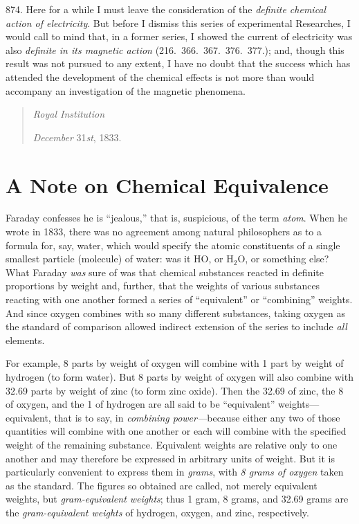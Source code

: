 874. Here for a while I must leave the consideration of the
\emph{definite chemical action of electricity}. But before I dismiss
this series of experimental Researches, I would call to mind that, in a
former series, I showed the current of electricity was also
\emph{definite in its magnetic action} (216.\ 366.\ 367.\ 376.\ 377.); and,
though this result was not pursued to any extent, I have no doubt that
the success which has attended the development of the chemical effects
is not more than would accompany an investigation of the magnetic
phenomena.

\begin{quotation}
\emph{Royal Institution}

\emph{December} 31\emph{st}, 1833.
\end{quotation}

\section*{A Note on Chemical Equivalence}

Faraday confesses he is ``jealous,'' that is, suspicious, of the term
\emph{atom}. When he wrote in 1833, there was no agreement among natural
philosophers as to a formula for, say, water, which would specify the
atomic constituents of a single smallest particle (mol\-e\-cule) of water:
was it HO, or H$_2$O, or something else? What Faraday \emph{was} sure of
was that chemical substances reacted in definite pro\-por\-tions by weight
and, further, that the weights of various substances reacting with one
another formed a series of ``equivalent'' or ``combining'' weights. And
since oxygen combines with so many different substances, taking oxygen
as the standard of comparison allowed indirect extension of the series
to include \emph{all} elements.

For example, 8 parts by weight of oxygen will combine with 1 part by
weight of hydrogen (to form water). But 8 parts by weight of oxygen will
also combine with 32.69 parts by weight of zinc (to form zinc oxide).
Then the 32.69 of zinc, the 8 of oxygen, and the 1 of hydrogen are all
said to be ``equivalent'' weights---equivalent, that is to say, in
\emph{combining power---}because either any two of those quantities will
combine with one another or each will combine with the specified weight
of the remaining substance. Equivalent weights are relative only to one
another and may therefore be expressed in arbitrary units of weight. But
it is particularly convenient to express them in \emph{grams}, with
\emph{8 grams of oxygen} taken as the standard. The figures so obtained
are called, not merely equivalent weights, but \emph{gram-equivalent
weights}; thus 1 gram, 8 grams, and 32.69 grams are the
\emph{gram-equivalent weights} of hydrogen, oxygen, and zinc,
respectively.

